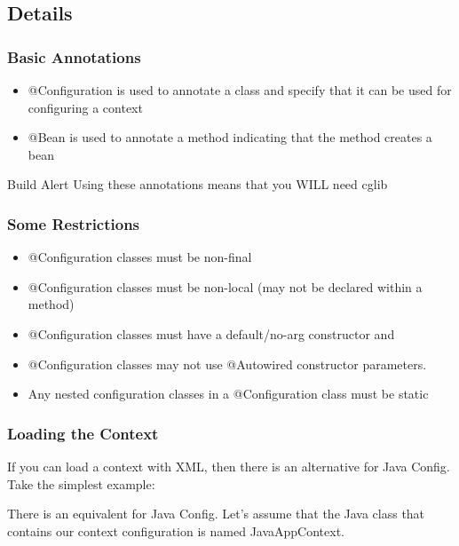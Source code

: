\documentclass[t,handout]{beamer}
\begin{document}
    \subsection{Details}
        \frame
        {
            \frametitle{Basic Annotations}
            \begin{itemize}
                \item @Configuration is used to annotate a class and specify
                      that it can be used for configuring a context
                \item @Bean is used to annotate a method indicating that the
                      method creates a bean
            \end{itemize}
            \begin{alertblock}{Build Alert}
                Using these annotations means that you WILL need cglib
            \end{alertblock}
        }

        \frame
        {
            \frametitle{Some Restrictions}
            \begin{itemize}
                \item @Configuration classes must be non-final
                \item @Configuration classes must be non-local (may not be
                      declared within a method)
                \item @Configuration classes must have a default/no-arg
                      constructor and
                \item @Configuration classes may not use @Autowired
                      constructor parameters.
                \item Any nested configuration classes in a @Configuration
                      class must be static
            \end{itemize}
        }

        \frame
        {
            \frametitle{Loading the Context}
            If you can load a context with XML, then there is an alternative
            for Java Config.  Take the simplest example:
            {\tiny
                
            }

            There is an equivalent for Java Config.  Let's assume that the
            Java class that contains our context configuration is named
            JavaAppContext.
            {\tiny
                
            }
        }
\end{document}
